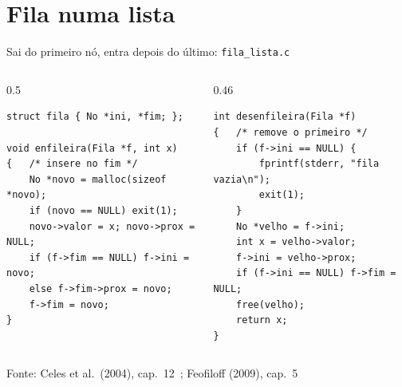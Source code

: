 \documentclass[aspectratio=169]{beamer}
\newcommand{\fonte}[1]{\vfill\hfill{\scriptsize\textcolor{UFSGray}{Fonte: #1}}}
\begin{document}
\section{Fila numa lista}

\begin{frame}[fragile]{Sai do primeiro nó, entra depois do último: \texttt{fila\_lista.c}}
  \begin{columns}[T]
    \begin{column}{0.5\textwidth}
\begin{lstlisting}[style=codC]
struct fila { No *ini, *fim; };

void enfileira(Fila *f, int x)
{   /* insere no fim */
    No *novo = malloc(sizeof *novo);
    if (novo == NULL) exit(1);
    novo->valor = x; novo->prox = NULL;
    if (f->fim == NULL) f->ini = novo;
    else f->fim->prox = novo;
    f->fim = novo;
}
\end{lstlisting}
    \end{column}
    \begin{column}{0.46\textwidth}
\begin{lstlisting}[style=codC]
int desenfileira(Fila *f)
{   /* remove o primeiro */
    if (f->ini == NULL) {
        fprintf(stderr, "fila vazia\n");
        exit(1);
    }
    No *velho = f->ini;
    int x = velho->valor;
    f->ini = velho->prox;
    if (f->ini == NULL) f->fim = NULL;
    free(velho);
    return x;
}
\end{lstlisting}
    \end{column}
  \end{columns}
  \begin{center}
  \end{center}
  \fonte{Celes et al.\ (2004), cap.~12~\cite{celes2004introducao};
    Feofiloff (2009), cap.~5~\cite{feofiloff2009algoritmos}}
\end{frame}
\end{document}
